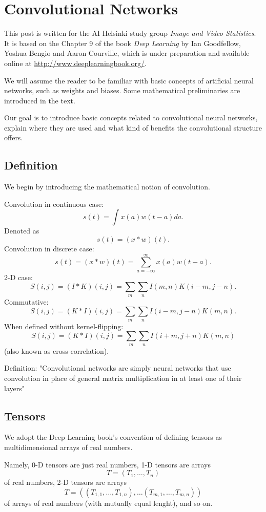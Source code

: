 \documentclass[]{article}
\begin{document}
\section{Convolutional Networks}
This post is written for the AI Helsinki study group \emph{Image and Video Statistics}.
It is based on the Chapter 9 of the book \emph{Deep Learning} by Ian Goodfellow,
Yoshua Bengio and Aaron Courville, which is under preparation and available
online at \url{http://www.deeplearningbook.org/}.

We will assume the reader to be familiar with basic concepts of artificial
neural networks, such as weights and biases. Some mathematical preliminaries are
introduced in the text.

Our goal is to introduce basic concepts related to convolutional neural networks,
explain where they are used and what kind of benefits the convolutional
structure offers.


\subsection{Definition}
We begin by introducing the mathematical notion of convolution.

Convolution in continuous case:
\[
s(t) = \int x(a)w(t - a)da.
\]
Denoted as
\[
s(t) = (x * w)(t).
\]
Convolution in discrete case:
\[
s(t) = (x * w)(t) = \sum_{a = -\infty}^{\infty} x(a)w(t - a).
\]
2-D case:
\[
S(i, j) = (I * K)(i, j) = \sum_m \sum_n I(m , n) K(i - m, j - n).
\]
Commutative:
\[
S(i, j) = (K * I)(i, j) = \sum_m \sum_n I(i - m , j - n) K(m, n).
\]
When defined without kernel-flipping:
\[
S(i, j) = (K * I)(i, j) = \sum_m \sum_n I(i + m , j + n) K(m, n)
\]
(also known as cross-correlation).

Definition: "Convolutional networks are simply neural networks that use
convolution in place of general matrix multiplication in at least one of their
layers"

\subsection{Tensors}
We adopt the Deep Learning book's convention of defining tensors as
multidimensional arrays of real numbers.

Namely, 0-D tensors are just real numbers, 1-D tensors are arrays
\[
T = (T_1, \ldots, T_n)
\]
of real numbers, 2-D tensors are arrays
\[
T = ((T_{1,1}, \ldots, T_{1,n}), \ldots (T_{m,1}, \ldots, T_{m,n}))
\]
of arrays of real numbers (with mutually equal lenght), and so on.
\end{document}
